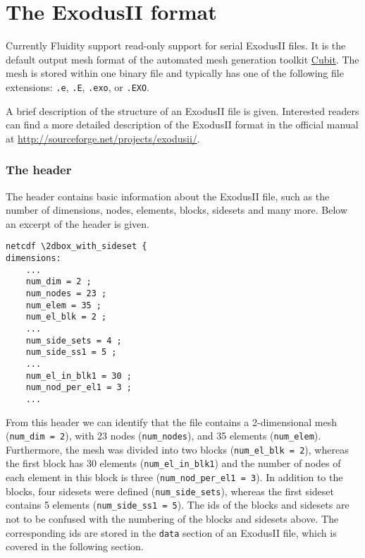 \section{The ExodusII format}
\label{sec:exodusii_format}

Currently Fluidity support read-only support for serial ExodusII files. It is the default
output mesh format of the automated mesh generation toolkit \href{http://cubit.sandia.gov/}{Cubit}.
The mesh is stored within one binary file and typically has one of the following file extensions:
\texttt{.e}, \texttt{.E}, \texttt{.exo}, or \texttt{.EXO}.

A brief description of the structure of an ExodusII file is given. Interested readers can find a
more detailed description of the ExodusII format in the official manual at
\url{http://sourceforge.net/projects/exodusii/}.

\subsubsection*{The header}
\label{ssec:exodusii_header_section}

The header contains basic information about the ExodusII file, such as the number of dimensions,
nodes, elements, blocks, sidesets and many more. Below an excerpt of the header is given.
\begin{lstlisting}
netcdf \2dbox_with_sideset {
dimensions:
    ...
    num_dim = 2 ;
    num_nodes = 23 ;
    num_elem = 35 ;
    num_el_blk = 2 ;
    ...
    num_side_sets = 4 ;
    num_side_ss1 = 5 ;
    ...
    num_el_in_blk1 = 30 ;
    num_nod_per_el1 = 3 ;
    ...
\end{lstlisting}

From this header we can identify that the file contains a 2-dimensional
mesh (\texttt{num\_dim = 2}), with 23 nodes (\texttt{num\_nodes}), and
35 elements (\texttt{num\_elem}). Furthermore, the mesh was divided into
two blocks (\texttt{num\_el\_blk = 2}), whereas the first block has
30 elements (\texttt{num\_el\_in\_blk1}) and the number of nodes of each
element in this block is three (\texttt{num\_nod\_per\_el1 = 3}). In addition
to the blocks, four sidesets were defined (\texttt{num\_side\_sets}),
whereas the first sideset contains 5 elements (\texttt{num\_side\_ss1 = 5}).
The ids of the blocks and sidesets are not to be confused with the numbering
of the blocks and sidesets above. The corresponding ids are stored in the
\texttt{data} section of an ExodusII file, which is covered in the following
section.

